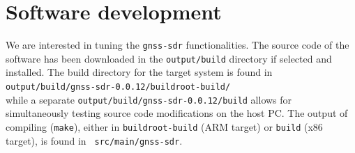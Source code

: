\documentclass[a4paper]{article}
\begin{document}
\section{Software development}

We are interested in tuning the {\tt gnss-sdr} functionalities. The source code of
the software has been downloaded in the {\tt output/build} directory if
selected and installed. The build directory 
for the target system is found in \\
{\tt output/build/gnss-sdr-0.0.12/buildroot-build/} 
\\while
a separate {\tt output/build/gnss-sdr-0.0.12/build} allows for simultaneously testing source
code modifications on the host PC. The output of compiling ({\tt make}), either in 
{\tt buildroot-build} (ARM target) or {\tt build} (x86 target), is found in {\tt 
src/main/gnss-sdr}.
\end{document}
